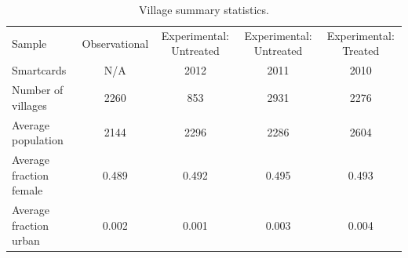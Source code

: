 \begin{table}

\caption{\label{tab:summaries}Village summary statistics.}
\centering
\begin{tabular}[t]{lcccc}
\toprule
Sample & Observational & Experimental: Untreated & Experimental: Untreated & Experimental: Treated\\
Smartcards & N/A & 2012 & 2011 & 2010\\
\midrule
Number of villages & 2260 & 853 & 2931 & 2276\\
Average population & 2144 & 2296 & 2286 & 2604\\
Average fraction female & 0.489 & 0.492 & 0.495 & 0.493\\
Average fraction urban & 0.002 & 0.001 & 0.003 & 0.004\\
\bottomrule
\end{tabular}
\end{table}
